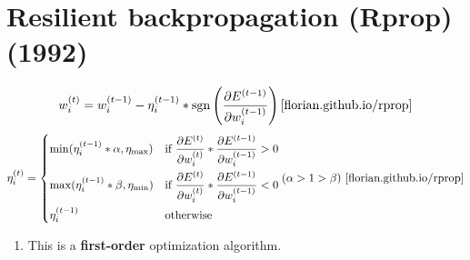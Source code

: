 


\section{Resilient backpropagation (Rprop) (1992) \cite{wiki-Rprop,pytorch-Rprop,florian.github.io/rprop}}\label{Resilient backpropagation (Rprop)}

\[
    \displaystyle w_i^{(t)} = w_i^{(t - 1)} - \eta_i^{(t - 1)} * \operatorname{sgn}\left(\dfrac{\partial E^{(t -
    1)}}{\partial w_i^{(t - 1)}}\right)
    \hfill
    \text{\cite{florian.github.io/rprop}}
\]
\[
    \displaystyle \eta_i^{(t)} = \begin{dcases}
    \min(\eta_i^{(t - 1)} * \alpha, \eta_{\max}) & \text{if } \displaystyle\dfrac{\partial E^{(t)}}{\partial w_i^{(t)}} * \displaystyle\dfrac{\partial E^{(t - 1)}}{\partial w_i^{(t - 1)}} > 0 \\
    \max(\eta_i^{(t - 1)} * \beta, \eta_{\min}) & \text{if } \displaystyle\dfrac{\partial E^{(t)}}{\partial w_i^{(t)}} * \displaystyle\dfrac{\partial E^{(t - 1)}}{\partial w_i^{(t - 1)}} < 0 \\
    \eta_i^{(t - 1)} & \text{otherwise}
    \end{dcases}
    \hfill
    (\alpha > 1 > \beta) \text{ \cite{florian.github.io/rprop}}
\]


\begin{enumerate}
    \item This is a \textbf{first-order} optimization algorithm.
\end{enumerate}

